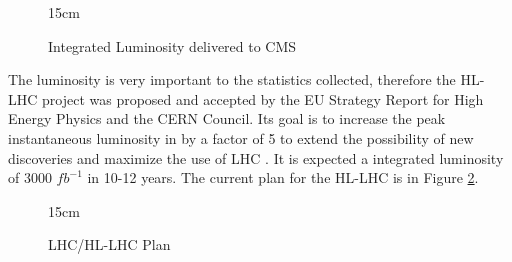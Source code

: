 \begin{figure}[!htm]{15cm} %
\caption{Integrated Luminosity delivered to CMS}%
\label{fig:int_lumi}
\end{figure}

The luminosity is very important to the statistics collected, therefore the HL-LHC project was proposed and accepted by the EU Strategy Report for High Energy Physics and the CERN Council. Its goal is to increase the peak instantaneous luminosity in by a factor of 5 to extend the possibility of new discoveries and maximize the use of LHC \cite{Aberle:2749422}. It is expected a integrated luminosity of 3000 $fb^{-1}$ in 10-12 years. The current plan for the HL-LHC is in Figure \ref{fig:LHC_Plan}.

\begin{figure}[!htm]{15cm} %
\caption{LHC/HL-LHC Plan}%
\label{fig:LHC_Plan}
\end{figure}

